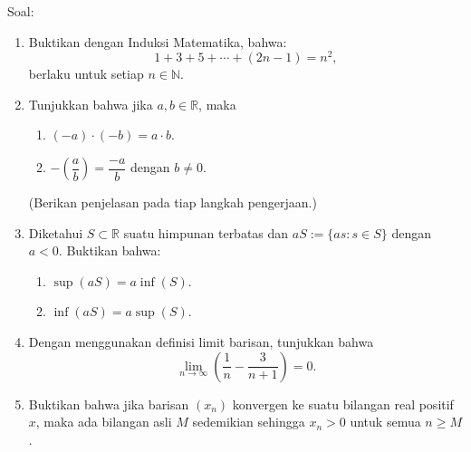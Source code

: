 \documentclass[11pt,a4paper]{article}
\newcommand{\R}{\mathbb{R}}
\newcommand{\N}{\mathbb{N}}
\begin{document}
\noindent Soal:
\begin{enumerate}
  \item Buktikan dengan Induksi Matematika, bahwa:
        \[
          1+3+5+\cdots+(2n-1)=n^2,
        \]
        berlaku untuk setiap $n\in\N$.

  \item Tunjukkan bahwa jika $a,b\in\R$, maka
        \begin{enumerate}
          \item $(-a)\cdot(-b)=a\cdot b$.
          \item $-\left(\dfrac{a}{b}\right)=\dfrac{-a}{b}$ dengan $b\ne0$.
        \end{enumerate}
        (Berikan penjelasan pada tiap langkah pengerjaan.)

  \item Diketahui $S\subset\R$ suatu himpunan terbatas dan
        $aS:=\{as:s\in S\}$ dengan $a<0$.
        Buktikan bahwa:
        \begin{enumerate}
          \item $\sup(aS)=a\inf(S)$.
          \item $\inf(aS)=a\sup(S)$.
        \end{enumerate}

  \item Dengan menggunakan definisi limit barisan, tunjukkan bahwa
        \[
          \lim_{n\to\infty}\left(\frac{1}{n}-\frac{3}{n+1}\right)=0.
        \]

  \item Buktikan bahwa jika barisan $(x_n)$ konvergen ke suatu bilangan real positif $x$,
        maka ada bilangan asli $M$ sedemikian sehingga $x_n>0$ untuk semua $n\ge M$.
\end{enumerate}
\end{document}
